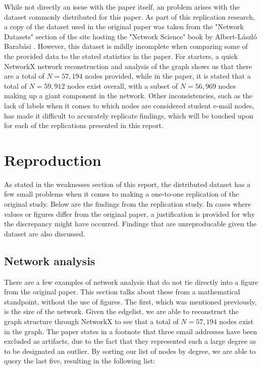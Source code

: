 \documentclass[a4paper]{article}
\begin{document}
\begin{multicols}{2}
While not directly an issue with the paper itself, an problem arises with the dataset commonly distributed for this paper. As part of this replication research, a copy of the dataset used in the original paper was taken from the "Network Datasets" section of the site hosting the "Network Science" book by Albert-László Barabási \cite{3}. However, this dataset is mildly incomplete when comparing some of the provided data to the stated statistics in the paper. For starters, a quick NetworkX network reconstruction and analysis of the graph shows us that there are a total of \(N = 57,	194\) nodes provided, while in the paper, it is stated that a total of \(N = 59,912\) nodes exist overall, with a subset of \(N = 56,969\) nodes making up a giant component in the network. Other inconsistencies, such as the lack of labels when it comes to which nodes are considered student e-mail nodes, has made it difficult to accurately replicate findings, which will be touched upon for each of the replications presented in this report. 

\section{Reproduction}
\hspace*{\parindent}As stated in the weaknesses section of this report, the distributed dataset has a few small problems when it comes to making a one-to-one replication of the original study. Below are the findings from the replication study. In cases where values or figures differ from the original paper, a justification is provided for why the discrepancy might have occurred. Findings that are unreproducable given the dataset are also discussed. 

\subsection{Network analysis}
\hspace*{\parindent}There are a few examples of network analysis that do not tie directly into a figure from the original paper. This section talks about these from a mathematical standpoint, without the use of figures. The first, which was mentioned previously, is the size of the network. Given the edgelist, we are able to reconstruct the graph structure through NetworkX to see that a total of \(N = 57,194\) nodes exist in the graph. The paper states in a footnote that three email addresses have been excluded as artifacts, due to the fact that they represented such a large degree as to be designated an outlier. By sorting our list of nodes by degree, we are able to query the last five, resulting in the following list:
\begin{align*}
[('13498', 802), ('11798', 1020), ('13678', 1228), \\('11028', 4171), ('32199', 6553)]
\end{align*}


\end{multicols}
\end{document}
